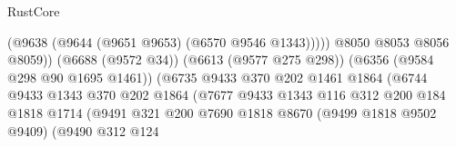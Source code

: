 \begin{lexlean}{RustCore}
\begin{coremodule}
                                                        (@9638
                                                          (@9644
                                                            (@9651 @9653)
                                                            (@6570 @9546 @1343)))))
                                                    @8050
                                                    @8053
                                                    @8056
                                                    @8059))
                                                (@6688 (@9572 @34))
                                                (@6613 (@9577 @275 @298))
                                                (@6356 (@9584 @298 @90 @1695 @1461))
                                                (@6735
                                                  @9433
                                                  @370
                                                  @202
                                                  @1461
                                                  @1864
                                                  (@6744
                                                    @9433
                                                    @1343
                                                    @370
                                                    @202
                                                    @1864
                                                    (@7677
                                                      @9433
                                                      @1343
                                                      @116
                                                      @312
                                                      @200
                                                      @184
                                                      @1818
                                                      @1714
                                                      (@9491
                                                        @321
                                                        @200
                                                        @7690
                                                        @1818
                                                        @8670
                                                        (@9499 @1818 @9502 @9409)
                                                        (@9490
                                                          @312
                                                          @124

\end{coremodule}
\end{lexlean}
